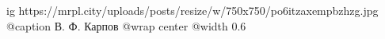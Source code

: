  
 
 
 
 

\ifcmt
  ig https://mrpl.city/uploads/posts/resize/w/750x750/po6itzaxempbzhzg.jpg
	@caption В. Ф. Карпов
  @wrap center
  @width 0.6
\fi
